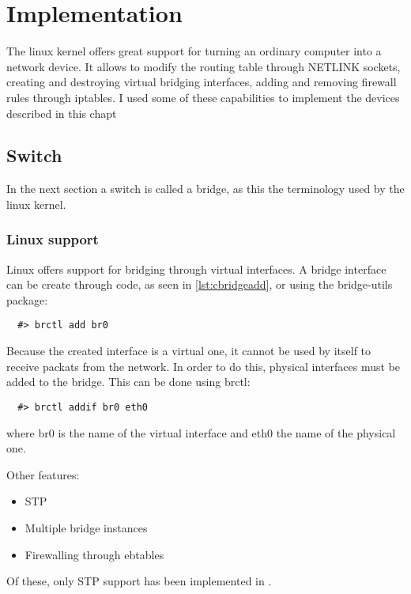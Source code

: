 \chapter{Implementation}
\label{chapter:impl}

The linux kernel offers great support for turning an ordinary computer into a network
device. It allows to modify the routing table through NETLINK sockets, creating
and destroying virtual bridging interfaces, adding and removing firewall rules through 
iptables. I used some of these capabilities to implement the devices described in this 
chapt	

\section{Switch}
\label{sec:switch-impl}

In the next section a switch is called a bridge, as this the terminology used by the linux kernel.

\subsection{Linux support}
\label{sub-sec:switch-lin}

Linux offers support for bridging through virtual interfaces. A bridge interface
can be create through code, as seen in \ref{lst:cbridgeadd}, or using the bridge-utils
package:
\lstset{language=zsh,caption=Adding a bridge interface,label=lst:sbridgeadd}
\begin{lstlisting}
  #> brctl add br0
\end{lstlisting}
Because the created interface is a virtual one, it cannot be used by itself to receive packats
from the network. In order to do this, physical interfaces must be added to the bridge. This 
can be done using brctl:
\lstset{language=zsh,caption=Adding a bridge interface,label=lst:sportadd}
\begin{lstlisting}
  #> brctl addif br0 eth0
\end{lstlisting}
where br0 is the name of the virtual interface and eth0 the name of the physical one.

Other features:
\begin{itemize}
  \item STP
  \item Multiple bridge instances
  \item Firewalling through ebtables
\end{itemize}
Of these, only STP support has been implemented in \textbf{\project}.

